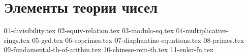 \section{Элементы теории чисел}
{01-divisibility.tex}
{02-equiv-relation.tex}
{03-modulo-eq.tex}
{04-multiplicative-rings.tex}
{05-gcd.tex}
{06-coprimes.tex}
{07-diaphantine-equations.tex}
{08-primes.tex}
{09-fundamental-th-of-arithm.tex}
{10-chinese-rem-th.tex}
{11-euler-fn.tex}
